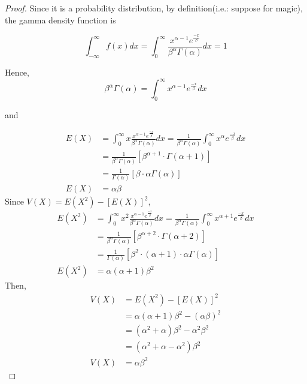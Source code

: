 \begin{proof}
    Since it is a probability distribution, by definition(i.e.: suppose for magic), the gamma density function is

    \[
        \int^\infty_{-\infty} f(x) dx 
        = \int^\infty_0 \frac{x^{\alpha - 1}e^{\frac{-x}{\beta}}}{\beta^\alpha\Gamma(\alpha)} dx = 1
    \]

    Hence,
    \[
        \beta^\alpha\Gamma(\alpha) 
        = 
        \int^\infty_0 x^{\alpha - 1}e^{\frac{-x}{\beta}} dx
    \]

    and

    \begin{align*}
        E(X) &= \int^\infty_0 x\frac{x^{\alpha - 1}e^{\frac{-x}{\beta}}}{\beta^\alpha\Gamma(\alpha)} dx 
        = \frac{1}{\beta^\alpha\Gamma(\alpha)} \int^\infty_0 x^\alpha e^{\frac{-x}{\beta}} dx \\
        &= \frac{1}{\beta^\alpha\Gamma(\alpha)} \left[\beta^{\alpha + 1} \cdot \Gamma(\alpha + 1)\right] \\
        &= \frac{1}{\Gamma(\alpha)} \left[\beta \cdot \alpha \Gamma(\alpha)\right] \\
        E(X) &= \alpha\beta
    \end{align*}
    Since $V(X) = E(X^2) - [E(X)]^2$,
    \begin{align*}
        E(X^2) &= \int^\infty_0 x^2\frac{x^{\alpha - 1}e^{\frac{-x}{\beta}}}{\beta^\alpha\Gamma(\alpha)} dx 
        = \frac{1}{\beta^\alpha\Gamma(\alpha)} \int^\infty_0 x^{\alpha + 1} e^{\frac{-x}{\beta}} dx \\
        &= \frac{1}{\beta^\alpha\Gamma(\alpha)} \left[\beta^{\alpha + 2} \cdot \Gamma(\alpha + 2)\right] \\
        &= \frac{1}{\Gamma(\alpha)} \left[\beta^2 \cdot (\alpha + 1)\cdot \alpha \Gamma(\alpha)\right] \\
        E(X^2) &= \alpha(\alpha+1)\beta^2
    \end{align*}
    Then,
    \begin{align*}
        V(X) &= E(X^2) - [E(X)]^2 \\
        &= \alpha(\alpha+1)\beta^2 - (\alpha\beta)^2 \\
        &= (\alpha^2 + \alpha)\beta^2 - \alpha^2\beta^2 \\
        &= (\alpha^2 + \alpha -  \alpha^2)\beta^2 \\
        V(X) &= \alpha\beta^2
    \end{align*}
\end{proof}
